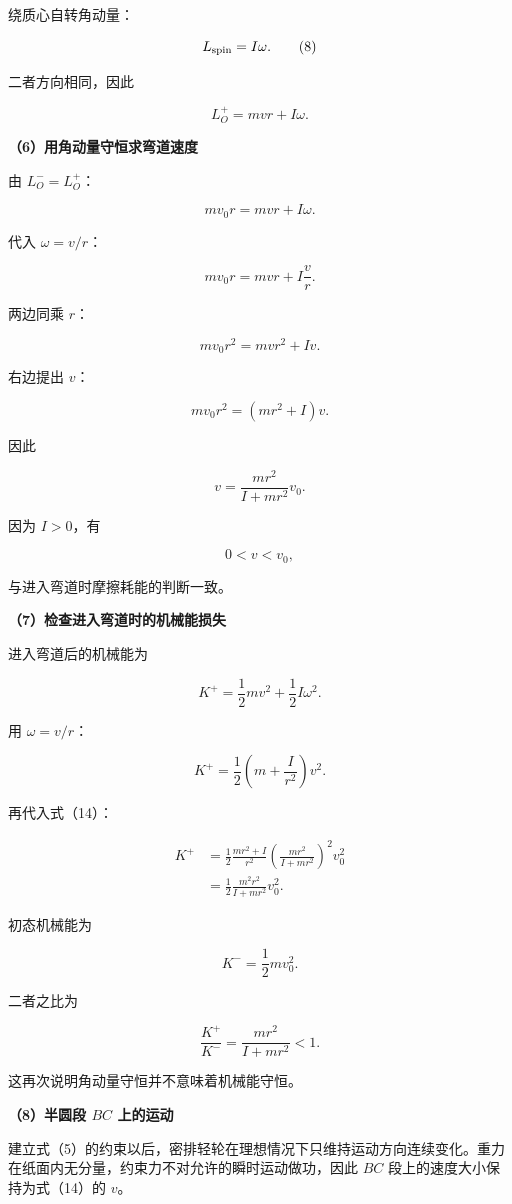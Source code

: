 \documentclass[12pt,a4paper,UTF8]{ctexart}
\begin{document}
绕质心自转角动量：

\[
L_{\rm spin}=I\omega.
\tag{8}
\]

二者方向相同，因此

\[
L_O^+=mvr+I\omega.
\tag{9}
\]

\textbf{（6）用角动量守恒求弯道速度}

由 \(L_O^-=L_O^+\)：

\[
mv_0r=mvr+I\omega.
\tag{10}
\]

代入 \(\omega=v/r\)：

\[
mv_0r=mvr+I\frac vr.
\tag{11}
\]

两边同乘 \(r\)：

\[
mv_0r^2=mvr^2+Iv.
\tag{12}
\]

右边提出 \(v\)：

\[
mv_0r^2=(mr^2+I)v.
\tag{13}
\]

因此

\[
\boxed{
v=\frac{mr^2}{I+mr^2}v_0
}.
\tag{14}
\]

因为 \(I>0\)，有

\[
0<v<v_0,
\]

与进入弯道时摩擦耗能的判断一致。

\textbf{（7）检查进入弯道时的机械能损失}

进入弯道后的机械能为

\[
K^+
=\frac12mv^2+\frac12I\omega^2.
\tag{15}
\]

用 \(\omega=v/r\)：

\[
K^+
=\frac12\left(m+\frac I{r^2}\right)v^2.
\tag{16}
\]

再代入式（14）：

\[
\begin{aligned}
K^+
&=\frac12\frac{mr^2+I}{r^2}
\left(\frac{mr^2}{I+mr^2}\right)^2v_0^2\\
&=\frac12
\frac{m^2r^2}{I+mr^2}v_0^2.
\end{aligned}
\tag{17}
\]

初态机械能为

\[
K^-=\frac12mv_0^2.
\tag{18}
\]

二者之比为

\[
\frac{K^+}{K^-}
=\frac{mr^2}{I+mr^2}<1.
\tag{19}
\]

这再次说明角动量守恒并不意味着机械能守恒。

\textbf{（8）半圆段 \(BC\) 上的运动}

建立式（5）的约束以后，密排轻轮在理想情况下只维持运动方向连续变化。重力在纸面内无分量，约束力不对允许的瞬时运动做功，因此
\(BC\) 段上的速度大小保持为式（14）的 \(v\)。
\end{document}
